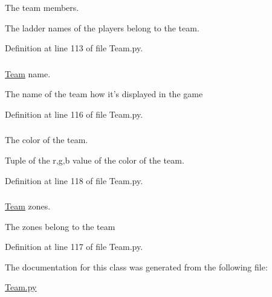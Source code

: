 The team members. 

The ladder names of the players belong to the team. 

Definition at line 113 of file Team.py.

\hypertarget{class_team_1_1_team_aa840b5c614936ab0ceb8c9a041fd63d3}{
\subsubsection[{\_\-\_\-name}]{}}
\label{class_team_1_1_team_aa840b5c614936ab0ceb8c9a041fd63d3}


\hyperlink{class_team_1_1_team}{Team} name. 

The name of the team how it's displayed in the game 

Definition at line 116 of file Team.py.

\hypertarget{class_team_1_1_team_ac98394f815e38111f61f85d60a124459}{
\subsubsection[{color}]{}}
\label{class_team_1_1_team_ac98394f815e38111f61f85d60a124459}


The color of the team. 

Tuple of the r,g,b value of the color of the team. 

Definition at line 118 of file Team.py.

\hypertarget{class_team_1_1_team_a585395bf34a71843cffaf71626138ab4}{
\subsubsection[{zones}]{}}
\label{class_team_1_1_team_a585395bf34a71843cffaf71626138ab4}


\hyperlink{class_team_1_1_team}{Team} zones. 

The zones belong to the team 

Definition at line 117 of file Team.py.



The documentation for this class was generated from the following file:\begin{DoxyCompactItemize}
\item 
\hyperlink{_team_8py}{Team.py}\end{DoxyCompactItemize}
